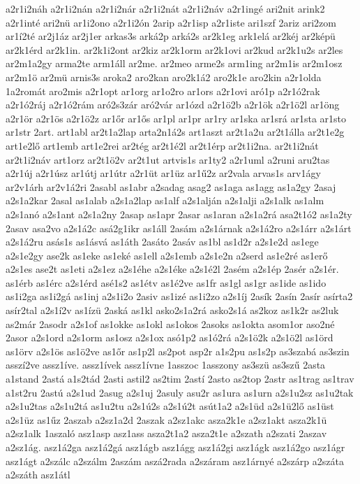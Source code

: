 {a2r1i2náh
a2r1i2nán
a2r1i2nár
a2r1i2nát
a2r1i2náv
a2r1ingé
ari2nit
arink2
a2r1inté
ari2nü
ar1i2ono
a2r1i2ón
2arip
a2r1isp
a2r1iste
ari1szf
2ariz
ari2zom
ar1í2té
ar2j1áz
ar2j1er
arkas3s
arká2p
arká2s
ar2k1eg
ark1elá
ar2kéj
ar2képü
ar2k1érd
ar2k1in.
ar2k1i2ont
ar2kiz
ar2k1orm
ar2k1ovi
ar2kud
ar2k1u2s
ar2les
ar2m1a2gy
arma2te
arm1áll
ar2me.
ar2meo
arme2s
arm1ing
ar2m1is
ar2m1osz
ar2m1ö
ar2mü
arnis3s
aroka2
aro2kan
aro2k1á2
aro2k1e
aro2kin
a2r1olda
1a2romát
aro2mis
a2r1opt
ar1org
ar1o2ro
ar1ors
a2r1ovi
aró1p
a2r1ó2rak
a2r1ó2ráj
a2r1ó2rám
aró2s3zár
aró2vár
ar1ózd
a2r1ö2b
a2r1ök
a2r1ö2l
ar1öng
a2r1ör
a2r1ös
a2r1ö2z
ar1őr
ar1ős
ar1pl
ar1pr
ar1ry
ar1ska
ar1srá
ar1sta
ar1sto
ar1str
2art.
art1abl
ar2t1a2lap
arta2n1á2s
art1aszt
ar2t1a2u
ar2t1álla
ar2t1e2g
art1e2lő
art1emb
art1e2rei
ar2tég
ar2t1é2l
ar2t1érp
ar2t1i2na.
ar2t1i2nát
ar2t1i2náv
art1orz
ar2t1ö2v
ar2t1ut
artvis1s
ar1ty2
a2r1uml
a2runi
aru2tas
a2r1új
a2r1úsz
ar1útj
ar1útr
a2r1üt
ar1üz
ar1ű2z
ar2vala
arvas1s
arv1ágy
ar2v1árh
ar2v1á2ri
2asabl
as1abr
a2sadag
asag2
as1aga
as1agg
as1a2gy
2asaj
a2s1a2kar
2asal
as1alab
a2s1a2lap
as1alf
a2s1alján
a2s1alji
a2s1alk
as1alm
a2s1anó
a2s1ant
a2s1a2ny
2asap
as1apr
2asar
as1aran
a2s1a2rá
asa2t1ó2
as1a2ty
2asav
asa2vo
a2s1á2c
asá2g1ikr
as1áll
2asám
a2s1árnak
a2s1á2ro
a2s1árr
a2s1árt
a2s1á2ru
asás1s
as1ásvá
as1áth
2asáto
2asáv
as1bl
as1d2r
a2s1e2d
as1ege
a2s1e2gy
ase2k
as1eke
as1eké
as1ell
a2s1emb
a2s1e2n
a2serd
as1e2ré
as1erő
a2s1es
ase2t
as1eti
a2s1ez
a2s1éhe
a2s1éke
a2s1é2l
2asém
a2s1ép
2asér
a2s1ér.
as1érb
as1érc
a2s1érd
asé1s2
as1étv
as1é2ve
as1fr
as1gl
as1gr
as1ide
as1ido
as1i2ga
as1i2gá
as1inj
a2s1i2o
2asiv
as1izé
as1i2zo
a2s1íj
2asík
2asín
2asír
asírta2
asír2tal
a2s1í2v
as1ízü
2aská
as1kl
asko2s1a2rá
asko2s1á
as2koz
as1k2r
as2luk
as2már
2asodr
a2s1of
as1okke
as1okl
as1okos
2asoks
as1okta
asom1or
aso2né
2asor
a2s1ord
a2s1orm
as1osz
a2s1ox
asó1p2
as1ó2rá
a2s1ö2k
a2s1ö2l
as1örd
as1örv
a2s1ös
as1ö2ve
as1őr
as1p2l
as2pot
asp2r
a1s2pu
as1s2p
as3szabá
as3szin
asszí2ve
assz1íve.
assz1ívek
assz1ívne
1asszoc
1asszony
as3szü
as3szű
2asta
a1stand
2astá
a1s2tád
2asti
astil2
as2tim
2astí
2asto
as2top
2astr
as1trag
as1trav
a1st2ru
2astú
a2s1ud
2asug
a2s1uj
2asuly
asu2r
as1ura
as1urn
a2s1u2sz
as1u2tak
a2s1u2tas
a2s1u2tá
as1u2tu
a2s1ú2s
a2s1ú2t
asút1a2
a2s1üd
a2s1ü2lő
as1üst
a2s1üz
as1űz
2aszab
a2sz1a2d
2aszak
a2sz1akc
asza2k1e
a2sz1akt
asza2k1ü
a2sz1alk
1aszaló
asz1asp
asz1ass
asza2t1a2
asza2t1e
a2szath
a2szati
2aszav
a2sz1ág.
asz1á2ga
asz1á2gá
asz1ágb
asz1ágg
asz1á2gi
asz1ágk
asz1á2go
asz1ágr
asz1ágt
a2szálc
a2szálm
2aszám
aszá2rada
a2száram
asz1árnyé
a2szárp
a2száta
a2száth
asz1átl
}
